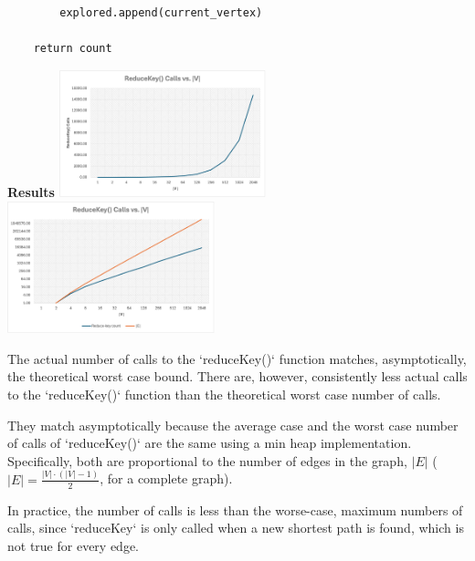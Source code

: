 \documentclass[12pt, letterpaper]{article}
\begin{document}
\begin{enumerate}
\begin{lstlisting}
        explored.append(current_vertex)
    
    return count
\end{lstlisting}


\textbf{ Results } \newline
\includegraphics[width=0.45\textwidth]{src/graph1.png}
\includegraphics[width=0.45\textwidth]{src/graph2.png}

The actual number of calls to the `reduceKey()` function matches, asymptotically, the theoretical worst case bound. There are, however, consistently less actual calls to the `reduceKey()` function than the theoretical worst case number of calls.

They match asymptotically because the average case and the worst case number of calls of `reduceKey()` are the same using a min heap implementation. Specifically, both are proportional to the number of edges in the graph, \(|E|\) (\(|E| = \frac{|V| \cdot (|V| - 1)}{2}\), for a complete graph). 

In practice, the number of calls is less than the worse-case, maximum numbers of calls, since `reduceKey` is only called when a new shortest path is found, which is not true for every edge.



\end{enumerate}
\end{document}
